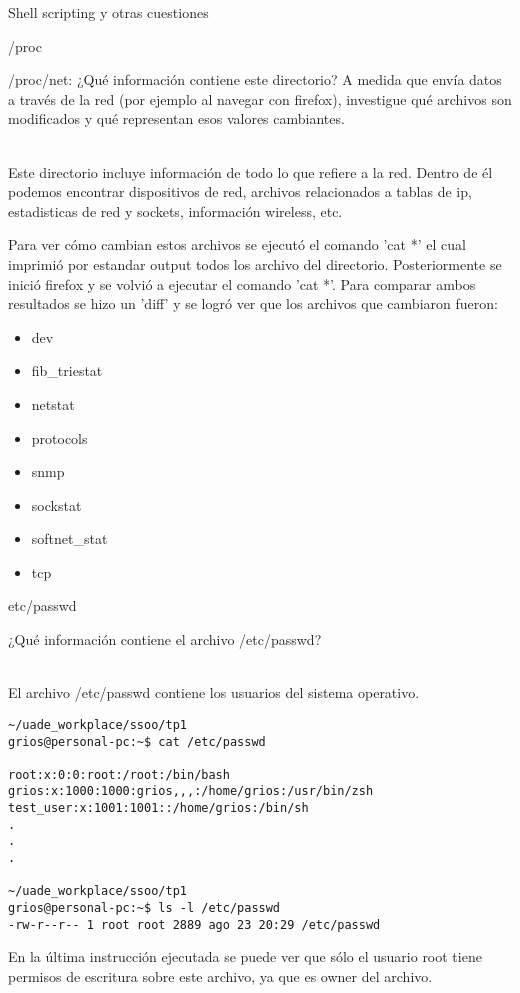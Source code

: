 \begin{section}{Shell scripting y otras cuestiones}
\begin{subsection}{/proc}
\begin{quoting}
/proc/net: ¿Qué información contiene este directorio? A medida que envía datos a través de la red
(por ejemplo al navegar con firefox), investigue qué archivos son modificados y qué representan esos
valores cambiantes.
\end{quoting}\\
Este directorio incluye información de todo lo que refiere a la red. Dentro de él podemos encontrar dispositivos de red, archivos relacionados a tablas de ip, estadisticas de red y sockets, información wireless, etc.

Para ver cómo cambian estos archivos se ejecutó el comando 'cat *' el cual imprimió por estandar output todos los archivo del directorio. Posteriormente se inició firefox y se volvió a ejecutar el comando 'cat *'. Para comparar ambos resultados se hizo un 'diff' y se logró ver que los archivos que cambiaron fueron:

\begin{itemize}
	\item dev
	\item fib\_triestat
	\item netstat
	\item protocols
	\item snmp
	\item sockstat
	\item softnet\_stat
	\item tcp
\end{itemize}
\end{subsection}

\begin{subsection}{etc/passwd}

\begin{quoting}
¿Qué información contiene el archivo /etc/passwd?
\end{quoting}\\
El archivo /etc/passwd contiene los usuarios del sistema operativo.
\begin{lstlisting}[style=Ubuntu]
~/uade_workplace/ssoo/tp1
grios@personal-pc:~$ cat /etc/passwd

root:x:0:0:root:/root:/bin/bash
grios:x:1000:1000:grios,,,:/home/grios:/usr/bin/zsh
test_user:x:1001:1001::/home/grios:/bin/sh
.
.
.

~/uade_workplace/ssoo/tp1
grios@personal-pc:~$ ls -l /etc/passwd
-rw-r--r-- 1 root root 2889 ago 23 20:29 /etc/passwd
\end{lstlisting}
En la última instrucción ejecutada se puede ver que sólo el usuario root tiene permisos de escritura sobre este archivo, ya que es owner del archivo.
\end{subsection}


\end{section}

